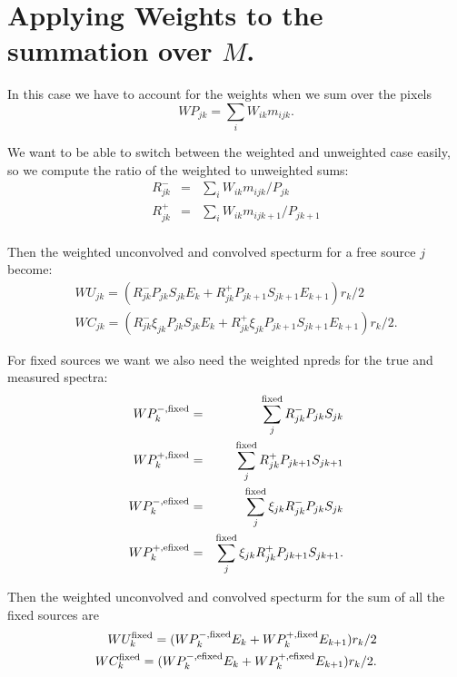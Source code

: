 \documentclass[preprint]{aastex}
\begin{document}
\section{Applying Weights to the summation over $M$.}

In this case we have to account for the weights when we sum over the pixels
\begin{equation}
  WP_{jk} = \sum_i W_{ik} m_{ijk}.
\end{equation}

We want to be able to switch between the weighted and unweighted case easily, 
so we compute the ratio of the weighted to unweighted sums:
\begin{eqnarray}
  R_{jk}^{-} & = & \sum_i W_{ik} m_{ijk} / P_{jk} \nonumber \\
  R_{jk}^{+} & = & \sum_i W_{ik} m_{ijk+1} / P_{jk+1} \nonumber \\
\end{eqnarray}

Then the weighted unconvolved and convolved specturm for a free source $j$ become:
\begin{eqnarray}
  WU_{jk} = ( R_{jk}^{-} P_{jk} S_{jk} E_k + R_{jk}^{+} P_{jk+1} S_{jk+1} E_{k+1} )  r_k / 2  \nonumber \\
  WC_{jk} = ( R_{jk}^{-} \xi_{jk} P_{jk} S_{jk} E_k + R_{jk}^{+} \xi_{jk} P_{jk+1} S_{jk+1} E_{k+1} )  r_k / 2.
\end{eqnarray}

For fixed sources we want we also need the weighted npreds for the true and measured spectra:
\begin{eqnarray}
  WP_{k}^{-, \rm fixed} & = & \sum_j^{\rm fixed} R_{jk}^{-} P_{jk} S_{jk}  \nonumber \\
  WP_{k}^{+, \rm fixed} & = & \sum_j^{\rm fixed} R_{jk}^{+} P_{jk+1} S_{jk+1}  \nonumber \\
  WP_{k}^{-, \rm efixed} & = & \sum_j^{\rm fixed} \xi_{jk} R_{jk}^{-} P_{jk} S_{jk}  \nonumber \\
  WP_{k}^{+, \rm efixed} & = & \sum_j^{\rm fixed} \xi_{jk} R_{jk}^{+} P_{jk+1} S_{jk+1}.  
\end{eqnarray}

Then the weighted unconvolved and convolved specturm for the sum of all the fixed sources are
\begin{eqnarray}
  WU_{k}^{\rm fixed} = ( WP_{k}^{-, \rm fixed} E_k + WP_{k}^{+, \rm fixed} E_{k+1} )  r_k / 2  \nonumber \\
  WC_{k}^{\rm fixed} = ( WP_{k}^{-, \rm efixed} E_k + WP_{k}^{+, \rm efixed} E_{k+1} )  r_k / 2.
\end{eqnarray}
\end{document}

